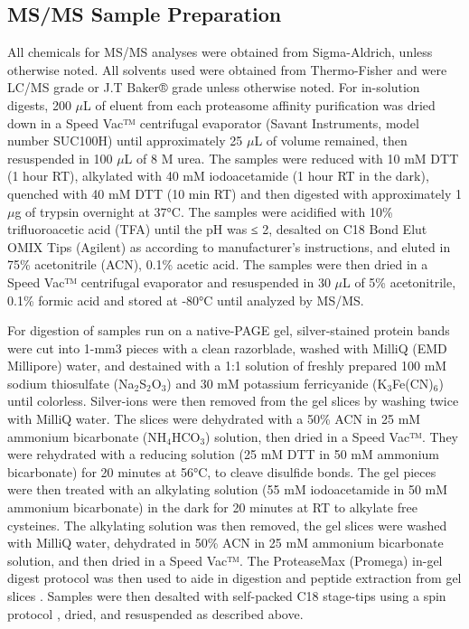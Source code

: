 \subsection{MS/MS Sample Preparation}
	All chemicals for MS/MS analyses were obtained from Sigma-Aldrich, unless otherwise noted. All solvents used were obtained from Thermo-Fisher and were LC/MS grade or J.T Baker® grade unless otherwise noted. For in-solution digests, 200 $\mu$L of eluent from each proteasome affinity purification was dried down in a Speed Vac™ centrifugal evaporator (Savant Instruments, model number SUC100H) until approximately 25 $\mu$L of volume remained, then resuspended in 100 $\mu$L of 8 M urea. The samples were reduced with 10 mM DTT (1 hour RT), alkylated with 40 mM iodoacetamide (1 hour RT in the dark), quenched with 40 mM DTT (10 min RT) and then digested with approximately 1 $\mu$g of trypsin overnight at 37°C. The samples were acidified with 10\% trifluoroacetic acid (TFA) until the pH was ≤ 2, desalted on C18 Bond Elut OMIX Tips (Agilent) as according to manufacturer’s instructions, and eluted in 75\% acetonitrile (ACN), 0.1\% acetic acid. The samples were then dried in a Speed Vac™ centrifugal evaporator and resuspended in 30 $\mu$L of 5\% acetonitrile, 0.1\% formic acid and stored at -80°C until analyzed by MS/MS. 
	
For digestion of samples run on a native-PAGE gel, silver-stained protein bands were cut into 1-mm3 pieces with a clean razorblade, washed with MilliQ (EMD Millipore) water, and destained with a 1:1 solution of freshly prepared 100 mM sodium thiosulfate (Na$_{2}$S$_{2}$O$_{3}$) and 30 mM potassium ferricyanide (K$_{3}$Fe(CN)$_{6}$) until colorless. Silver-ions were then removed from the gel slices by washing twice with MilliQ water. The slices were dehydrated with a 50\% ACN in 25 mM ammonium bicarbonate (NH$_{4}$HCO$_{3}$) solution, then dried in a Speed Vac™. They were rehydrated with a reducing solution (25 mM DTT in 50 mM ammonium bicarbonate) for 20 minutes at 56°C, to cleave disulfide bonds. The gel pieces were then treated with an alkylating solution (55 mM iodoacetamide in 50 mM ammonium bicarbonate) in the dark for 20 minutes at RT to alkylate free cysteines. The alkylating solution was then removed, the gel slices were washed with MilliQ water, dehydrated in 50\% ACN in 25 mM ammonium bicarbonate solution, and then dried in a Speed Vac™. The ProteaseMax (Promega) in-gel digest protocol was then used to aide in digestion and peptide extraction from gel slices \citep{saveliev13}. Samples were then desalted with self-packed C18 stage-tips \citep{rappsilber03} using a spin protocol \citep{yu14} , dried, and resuspended as described above.

